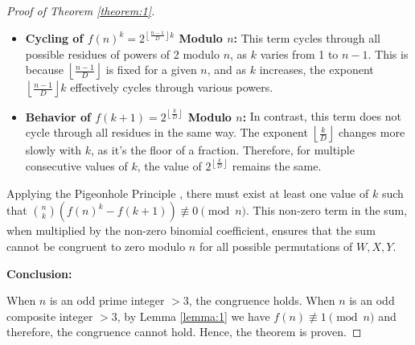 \documentclass{article}
\theoremstyle{plain}
\theoremstyle{definition}
\begin{document}
\begin{proof}[Proof of Theorem \ref{theorem:1}]
\begin{itemize}
    \item \textbf{Cycling of \( f(n)^k = 2^{\left\lfloor \frac{n-1}{D} \right\rfloor k} \) Modulo \( n \):} This term cycles through all possible residues of powers of 2 modulo \( n \), as \( k \) varies from 1 to \( n-1 \). This is because \( \left\lfloor \frac{n-1}{D} \right\rfloor \) is fixed for a given \( n \), and as \( k \) increases, the exponent \( \left\lfloor \frac{n-1}{D} \right\rfloor k \) effectively cycles through various powers.
    \item \textbf{Behavior of \( f(k+1) = 2^{\left\lfloor \frac{k}{D} \right\rfloor} \) Modulo \( n \):} In contrast, this term does not cycle through all residues in the same way. The exponent \( \left\lfloor \frac{k}{D} \right\rfloor \) changes more slowly with \( k \), as it's the floor of a fraction. Therefore, for multiple consecutive values of \( k \), the value of \( 2^{\left\lfloor \frac{k}{D} \right\rfloor} \) remains the same.
\end{itemize}    

Applying the Pigeonhole Principle \cite{rosen2012}, there must exist at least one value of \( k \) such that \( \binom{n}{k} \left(f(n)^k - f(k+1)\right) \not\equiv 0 \pmod{n} \). This non-zero term in the sum, when multiplied by the non-zero binomial coefficient, ensures that the sum cannot be congruent to zero modulo \( n \) for all possible permutations of $W, X, Y$.

\textbf{Conclusion:}

When $n$ is an odd prime integer $>3$, the congruence holds. When $n$ is an odd composite integer $>3$, by Lemma \ref{lemma:1} we have $f(n) \not\equiv 1 \pmod{n}$ and therefore, the congruence cannot hold. Hence, the theorem is proven.
\end{proof}
\end{document}
